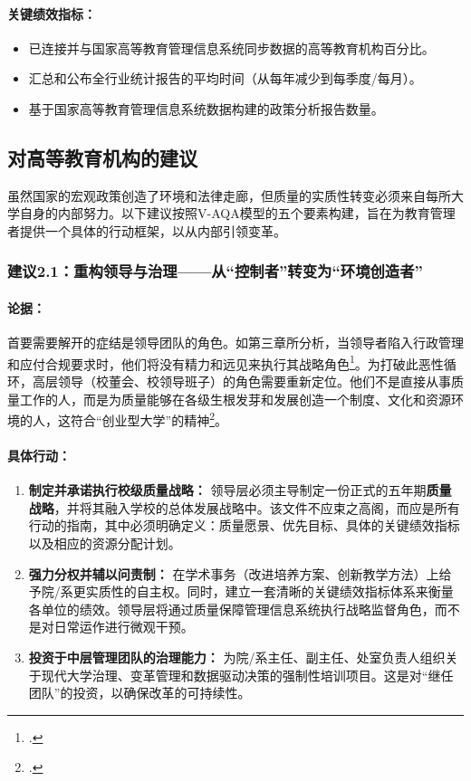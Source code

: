 \paragraph{关键绩效指标：}
\begin{itemize}
    \item 已连接并与国家高等教育管理信息系统同步数据的高等教育机构百分比。
    \item 汇总和公布全行业统计报告的平均时间（从每年减少到每季度/每月）。
    \item 基于国家高等教育管理信息系统数据构建的政策分析报告数量。
\end{itemize}

\subsection{对高等教育机构的建议}
\label{subsec:khuyen_nghi_csgddh_detailed}

虽然国家的宏观政策创造了环境和法律走廊，但质量的实质性转变必须来自每所大学自身的内部努力。以下建议按照V-AQA模型的五个要素构建，旨在为教育管理者提供一个具体的行动框架，以从内部引领变革。

\subsubsection{建议2.1：重构领导与治理——从“控制者”转变为“环境创造者”}

\paragraph{论据：}
首要需要解开的症结是领导团队的角色。如第三章所分析，当领导者陷入行政管理和应付合规要求时，他们将没有精力和远见来执行其战略角色\footcite{lypham_aosat_2024}。为打破此恶性循环，高层领导（校董会、校领导班子）的角色需要重新定位。他们不是直接从事质量工作的人，而是为质量能够在各级生根发芽和发展创造一个制度、文化和资源环境的人，这符合“创业型大学”的精神\footcite{clark_1998}。

\paragraph{具体行动：}
\begin{enumerate}
    \item \textbf{制定并承诺执行校级质量战略：} 领导层必须主导制定一份正式的五年期\textbf{质量战略}，并将其融入学校的总体发展战略中。该文件不应束之高阁，而应是所有行动的指南，其中必须明确定义：质量愿景、优先目标、具体的关键绩效指标以及相应的资源分配计划。
    \item \textbf{强力分权并辅以问责制：} 在学术事务（改进培养方案、创新教学方法）上给予院/系更实质性的自主权。同时，建立一套清晰的关键绩效指标体系来衡量各单位的绩效。领导层将通过质量保障管理信息系统执行战略监督角色，而不是对日常运作进行微观干预。
    \item \textbf{投资于中层管理团队的治理能力：} 为院/系主任、副主任、处室负责人组织关于现代大学治理、变革管理和数据驱动决策的强制性培训项目。这是对“继任团队”的投资，以确保改革的可持续性。
\end{enumerate}

